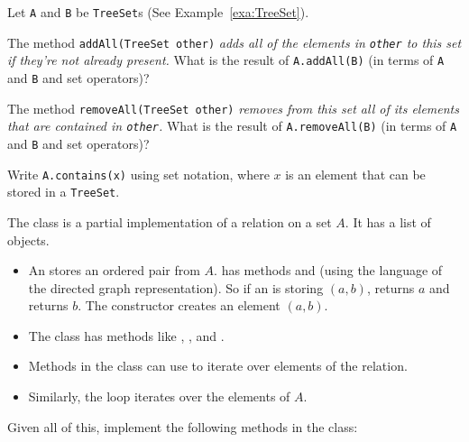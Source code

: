 \begin{pro}
Let \verb+A+ and \verb+B+ be \verb+TreeSet+s (See Example~\ref{exa:TreeSet}).
\begin{lenum}
\item  
The method \verb+addAll(TreeSet other)+
{\em adds all of the elements in \verb+other+ to this set if they're not already present.}
What is the result of \verb+A.addAll(B)+ (in terms of \verb+A+ and \verb+B+ and set operators)?
\item 
The method \verb+removeAll(TreeSet other)+
{\em removes from this set all of its elements that are contained in \verb+other+.}
What is the result of \verb+A.removeAll(B)+ (in terms of \verb+A+ and \verb+B+ and set operators)?
\item
Write \verb+A.contains(x)+ using set notation, where $x$ is an element that can be stored in a \verb+TreeSet+.
\end{lenum}
\end{pro}


\begin{pro}
The class  is a partial implementation of a relation on a set $A$.
It has a list of  objects.  
\begin{itemize}
\item
An  stores an ordered pair from $A$.  
 has methods  and  
(using the language of the directed graph representation).  
So if an  is storing $(a,b)$,  returns $a$ and  returns $b$.  
The constructor  creates an element $(a,b)$.
\item The 
 class has methods like , 
,  and .
\item
Methods in the  class can use  to iterate over
elements of the relation.   
\item
Similarly, the loop   iterates over the elements of $A$.
\end{itemize}
Given all of this, implement the following methods in the  class: 
\begin{lenum}
\item
{}
\item
{}
\item
{}
\end{lenum}
\end{pro}
